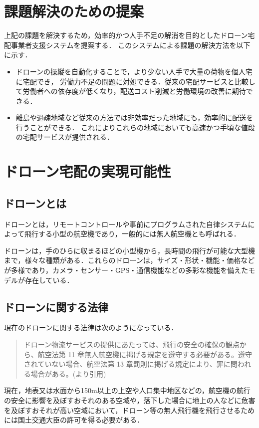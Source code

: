 \documentclass[a4paper, titlepage]{jsarticle}
\begin{document}
\section{課題解決のための提案}
上記の課題を解決するため，効率的かつ人手不足の解消を目的としたドローン宅配事業者支援システムを提案する．
このシステムによる課題の解決方法を以下に示す．
\begin{itemize}
  \item ドローンの操縦を自動化することで，より少ない人手で大量の荷物を個人宅に宅配でき，
        労働力不足の問題に対処できる．従来の宅配サービスと比較して労働者への依存度が低くなり，配送コスト削減と労働環境の改善に期待できる．
  \item 離島や過疎地域など従来の方法では非効率だった地域にも，効率的に配送を行うことができる．
        これによりこれらの地域においても高速かつ手頃な値段の宅配サービスが提供される．
\end{itemize}

\section{ドローン宅配の実現可能性}
\subsection{ドローンとは}
ドローンとは，リモートコントロールや事前にプログラムされた自律システムによって飛行する小型の航空機であり，一般的には無人航空機とも呼ばれる．

ドローンは，手のひらに収まるほどの小型機から，長時間の飛行が可能な大型機まで，様々な種類がある．これらのドローンは，サイズ・形状・機能・価格などが多様であり，カメラ・センサー・GPS・通信機能などの多彩な機能を備えたモデルが存在している．

\subsection{ドローンに関する法律}
現在のドローンに関する法律は次のようになっている．
\begin{quote}
  ドローン物流サービスの提供にあたっては、飛行の安全の確保の観点から、航空法第 11 章無人航空機に掲げる規定を遵守する必要がある。遵守されていない場合、航空法第 13 章罰則に掲げる規定により、罪に問われる場合がある。(\cite{delivery_guidelines_2023}より引用)
\end{quote}

現在，地表又は水面から150m以上の上空や人口集中地区などの，航空機の航行の安全に影響を及ぼすおそれのある空域や，落下した場合に地上の人などに危害を及ぼすおそれが高い空域において，ドローン等の無人飛行機を飛行させるためには国土交通大臣の許可を得る必要がある．
\end{document}
